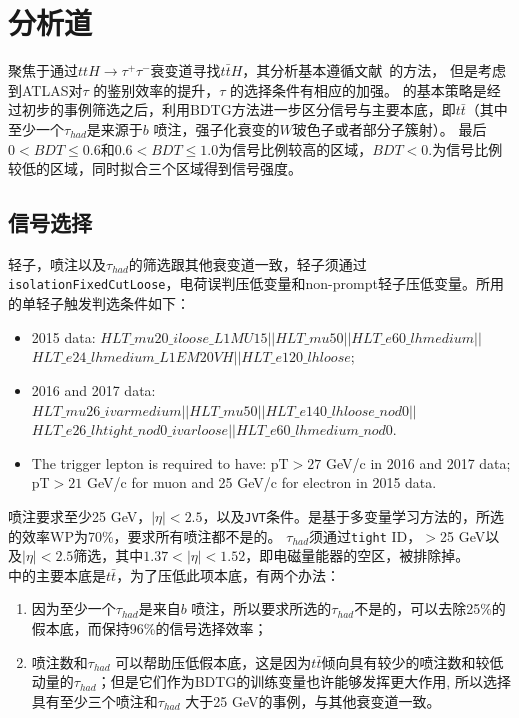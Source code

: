 \chapter{\ltwotau 分析道}\label{chap:1l2tau}
\ltwotau 聚焦于通过$ttH\rightarrow \tau^+\tau^-$衰变道寻找$t\bar{t}H$，其分析基本遵循文献~\cite{}的方法，
但是考虑到ATLAS对$\tau$ 的鉴别效率的提升，$\tau$ 的选择条件有相应的加强。
\ltwotau 的基本策略是经过初步的事例筛选之后，利用BDTG方法进一步区分信号与主要本底，即$t\bar{t}$（其中至少一个$\tau_{had}$是来源于$b$ 喷注，强子化衰变的$W$玻色子或者部分子簇射）。
最后$0<BDT\le 0.6$和$0.6<BDT\le 1.0$为信号比例较高的区域，$BDT<0.$为信号比例较低的区域，同时拟合三个区域得到信号强度。

\section{信号选择}
轻子，喷注以及$\tau_{had}$的筛选跟其他衰变道一致，轻子须通过\texttt{isolationFixedCutLoose}，电荷误判压低变量和non-prompt轻子压低变量。所用的单轻子触发判选条件如下：
\begin{itemize}
\item 2015 data: $HLT\_mu20\_iloose\_L1MU15 || HLT\_mu50 || HLT\_e60\_lhmedium ||$ \\
$ HLT\_e24\_lhmedium\_L1EM20VH || HLT\_e120\_lhloose$;
\item 2016 and 2017 data: $HLT\_mu26\_ivarmedium || HLT\_mu50 || HLT\_e140\_lhloose\_nod0 ||$ \\
$HLT\_e26\_lhtight\_nod0\_ivarloose || HLT\_e60\_lhmedium\_nod0$.
\item The trigger lepton is required to have: pT$>27$ GeV/c in 2016 and 2017 data; pT$>21$ GeV/c for muon and 25 GeV/c for electron in 2015 data.
\end{itemize}
喷注\pt 要求至少25 GeV，$|\eta|<2.5$，以及\texttt{JVT}条件。\btag 是基于多变量学习方法的，所选的\btag 效率WP为70\%，\ltwotau 要求所有喷注都不是\btagged 的。
$\tau_{had}$须通过\texttt{tight} ID，\pt$>$25 GeV以及$|\eta|<2.5$筛选，其中$1.37<|\eta|<1.52$，即电磁量能器的空区，被排除掉。\\
\ltwotau 中的主要本底是$t\bar{t}$，为了压低此项本底，有两个办法：
\begin{enumerate}
  \item 因为至少一个$\tau_{had}$是来自$b$ 喷注，所以要求所选的$\tau_{had}$不是\btagged 的，可以去除25\%的假本底，而保持96\%的信号选择效率；
  \item 喷注数和$\tau_{had}$ \pt 可以帮助压低假本底，这是因为$t\bar{t}$倾向具有较少的喷注数和较低动量的$\tau_{had}$；但是它们作为BDTG的训练变量也许能够发挥更大作用,
    所以选择具有至少三个喷注和$\tau_{had}$ \pt 大于25 GeV的事例，与其他衰变道一致。
\end{enumerate}
